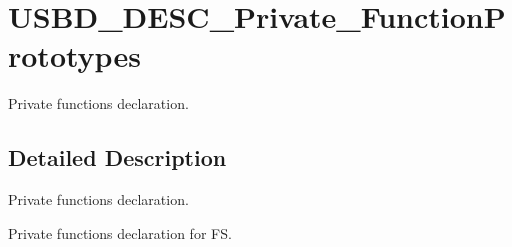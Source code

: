 \hypertarget{group__USBD__DESC__Private__FunctionPrototypes}{}\section{U\+S\+B\+D\+\_\+\+D\+E\+S\+C\+\_\+\+Private\+\_\+\+Function\+Prototypes}
\label{group__USBD__DESC__Private__FunctionPrototypes}


Private functions declaration.  




\subsection{Detailed Description}
Private functions declaration. 

Private functions declaration for FS.
